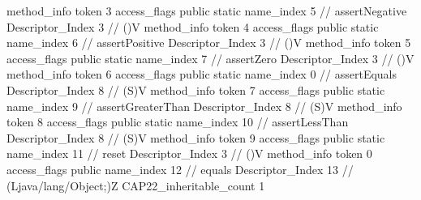 {{{{{				}
				method_info {
					token	3
					access_flags	public static
					name_index	5		// assertNegative
					Descriptor_Index	3		// ()V
				}
				method_info {
					token	4
					access_flags	public static
					name_index	6		// assertPositive
					Descriptor_Index	3		// ()V
				}
				method_info {
					token	5
					access_flags	public static
					name_index	7		// assertZero
					Descriptor_Index	3		// ()V
				}
				method_info {
					token	6
					access_flags	public static
					name_index	0		// assertEquals
					Descriptor_Index	8		// (S)V
				}
				method_info {
					token	7
					access_flags	public static
					name_index	9		// assertGreaterThan
					Descriptor_Index	8		// (S)V
				}
				method_info {
					token	8
					access_flags	public static
					name_index	10		// assertLessThan
					Descriptor_Index	8		// (S)V
				}
				method_info {
					token	9
					access_flags	public static
					name_index	11		// reset
					Descriptor_Index	3		// ()V
				}
				method_info {
					token	0
					access_flags	public
					name_index	12		// equals
					Descriptor_Index	13		// (Ljava/lang/Object;)Z
				}
			}
			CAP22_inheritable_count	1
		}
	}
}
